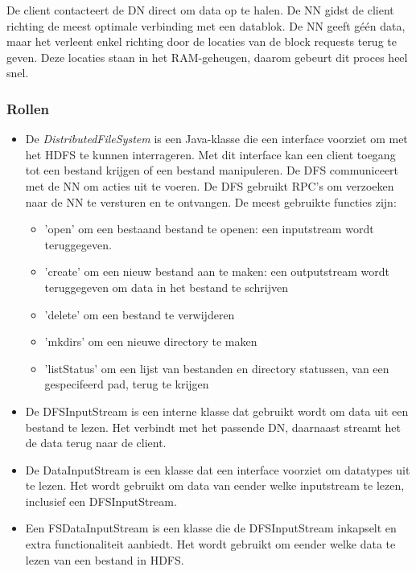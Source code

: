\documentclass[a4paper,10pt,twoside]{report}
\begin{document}
De client contacteert de DN direct om data op te halen. De NN gidst de client richting de meest optimale verbinding met een datablok. De NN geeft géén data, maar het verleent enkel richting door de locaties van de block requests terug te geven. Deze locaties staan in het RAM-geheugen, daarom gebeurt dit proces heel snel.

\subsubsection{Rollen}

\begin{itemize}
	\item De \textit{DistributedFileSystem} is een Java-klasse die een interface voorziet om met het HDFS te kunnen interrageren. Met dit interface kan een client toegang tot een bestand krijgen of een bestand manipuleren. De DFS communiceert met de NN om acties uit te voeren. De DFS gebruikt RPC's om verzoeken naar de NN te versturen en te ontvangen. De meest gebruikte functies zijn: 
	\begin{itemize}
		\item 'open' om een bestaand bestand te openen: een inputstream wordt teruggegeven.
		\item 'create' om een nieuw bestand aan te maken: een outputstream wordt teruggegeven om data in het bestand te schrijven
		\item 'delete' om een bestand te verwijderen
		\item 'mkdirs' om een nieuwe directory te maken
		\item 'listStatus' om een lijst van bestanden en directory statussen, van een gespecifeerd pad, terug te krijgen
	\end{itemize}
	\item De DFSInputStream is een interne klasse dat gebruikt wordt om data uit een bestand te lezen. Het verbindt met het passende DN, daarnaast streamt het de data terug naar de client.
	\item De DataInputStream is een klasse dat een interface voorziet om datatypes uit te lezen. Het wordt gebruikt om data van eender welke inputstream te lezen, inclusief een DFSInputStream.
	\item Een FSDataInputStream is een klasse die de DFSInputStream inkapselt en extra functionaliteit aanbiedt. Het wordt gebruikt om eender welke data te lezen van een bestand in HDFS.
\end{itemize}
\end{document}

